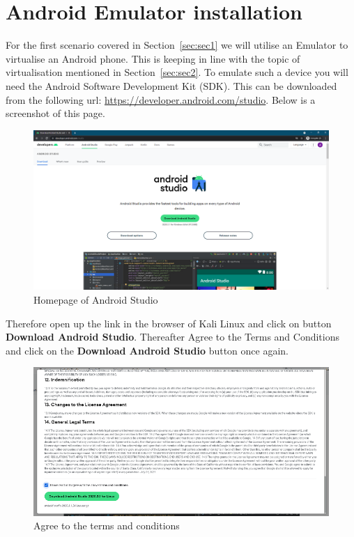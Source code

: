 \documentclass[a4paper, 12pt, titlepage]{report}
\begin{document}
\section{Android Emulator installation}
For the first scenario covered in Section~\ref{sec:sec1} we will utilise an Emulator to virtualise an Android phone. This is keeping in line with the topic of virtualisation mentioned in Section~\ref{sec:sec2}. To emulate such a device you will need the Android Software Development Kit (SDK). This can be downloaded from the following url: \url{https://developer.android.com/studio}. Below is a screenshot of this page.
\begin{figure}[H]
    \centering
    \includegraphics[scale=0.5]{pics/as1.PNG}
    \caption{Homepage of Android Studio}
\end{figure}
Therefore open up the link in the browser of Kali Linux and click on button \textbf{Download Android Studio}. Thereafter Agree to the Terms and Conditions and click on the \textbf{Download Android Studio} button once again.
\begin{figure}[H]
    \centering
    \includegraphics[scale=0.5]{pics/as2.PNG}
    \caption{Agree to the terms and conditions}
\end{figure}
\end{document}
